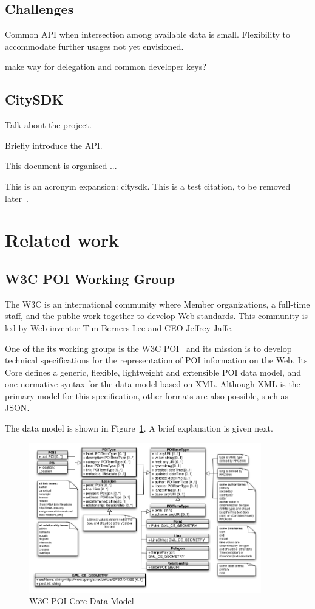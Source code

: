 \documentclass[times]{ettauth}
\begin{document}
\subsection{Challenges}
Common API when intersection among available data is small.
Flexibility to accommodate further usages not yet envisioned.

make way for delegation and common developer keys?


\subsection{CitySDK}
Talk about the project.

Briefly introduce the API.

This document is organised ...

This is an acronym expansion: \ac{citysdk}.
This is a test citation, to be removed later~\cite{1509968}.



\section{Related work}

\subsection{\acf{W3C} POI Working Group}
\label{section:poi-wg}
The \ac{W3C} is an international community where Member organizations, a full-time staff, and the public work together to develop Web standards. This community is led by Web inventor Tim Berners-Lee and CEO Jeffrey Jaffe. 

One of the its working groups is the \ac{W3C} POI~\cite{w3c-poi} and its mission is to develop technical specifications for the representation of \acf{POI} information on the Web. Its Core defines a generic, flexible, lightweight and extensible POI data model, and one normative syntax for the data model based on \acf{XML}. Although \ac{XML} is the primary model for this specification, other formats are also possible, such as \acf{JSON}.

The data model is shown in Figure~\ref{fig:data-model}. A brief explanation is given next.

\begin{figure}[!ht]
\centering
\includegraphics[width=0.9\textwidth]{images/uml}
\caption{W3C POI Core Data Model}
\label{fig:data-model}
\end{figure}
\end{document}
